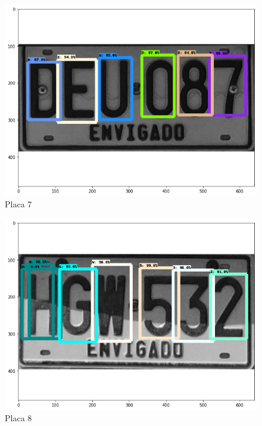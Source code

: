 
\begin{figure}[H]
\centering
\includegraphics[width=0.4\linewidth]{imagenes/caracteres detectados/nuevo entrenamiento/21.png}
\caption{Placa 7}
\label{fig:caracteres detectados p8}
\end{figure}

\begin{table}[H]
    \centering
    \caption{Detección de caracteres con porcentajes de acierto placa 7}
    \label{tab:p8}
\end{table}


\begin{figure}[H]
\centering
\includegraphics[width=0.4\linewidth]{imagenes/caracteres detectados/nuevo entrenamiento/2.png}
\caption{Placa 8}
\label{fig:caracteres detectados p9}
\end{figure}

